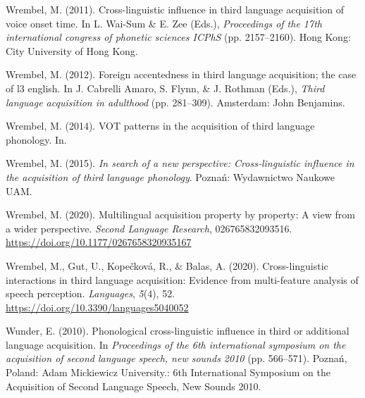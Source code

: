\documentclass[
  english,
  man]{apa6}
\begin{document}
\leavevmode\hypertarget{ref-wrembel_cross-linguistic_2011}{}%
Wrembel, M. (2011). Cross-linguistic influence in third language acquisition of voice onset time. In L. Wai-Sum \& E. Zee (Eds.), \emph{Proceedings of the 17th international congress of phonetic sciences ICPhS} (pp. 2157--2160). Hong Kong: City University of Hong Kong.

\leavevmode\hypertarget{ref-wrembel_foreign_2012}{}%
Wrembel, M. (2012). Foreign accentedness in third language acquisition; the case of l3 english. In J. Cabrelli Amaro, S. Flynn, \& J. Rothman (Eds.), \emph{Third language acquisition in adulthood} (pp. 281--309). Amsterdam: John Benjamins.

\leavevmode\hypertarget{ref-wrembel_vot_2014}{}%
Wrembel, M. (2014). VOT patterns in the acquisition of third language phonology. In.

\leavevmode\hypertarget{ref-wrembel_search_2015}{}%
Wrembel, M. (2015). \emph{In search of a new perspective: Cross-linguistic influence in the acquisition of third language phonology}. Poznań: Wydawnictwo Naukowe UAM.

\leavevmode\hypertarget{ref-wrembel_multilingual_2020}{}%
Wrembel, M. (2020). Multilingual acquisition property by property: A view from a wider perspective. \emph{Second Language Research}, 026765832093516. \url{https://doi.org/10.1177/0267658320935167}

\leavevmode\hypertarget{ref-wrembel_cross-linguistic_2020}{}%
Wrembel, M., Gut, U., Kopečková, R., \& Balas, A. (2020). Cross-linguistic interactions in third language acquisition: Evidence from multi-feature analysis of speech perception. \emph{Languages}, \emph{5}(4), 52. \url{https://doi.org/10.3390/languages5040052}

\leavevmode\hypertarget{ref-wunder_phonological_2010}{}%
Wunder, E. (2010). Phonological cross-linguistic influence in third or additional language acquisition. In \emph{Proceedings of the 6th international symposium on the acquisition of second language speech, new sounds 2010} (pp. 566--571). Poznań, Poland: Adam Mickiewicz University.: 6th International Symposium on the Acquisition of Second Language Speech, New Sounds 2010.

\endgroup
\end{document}
